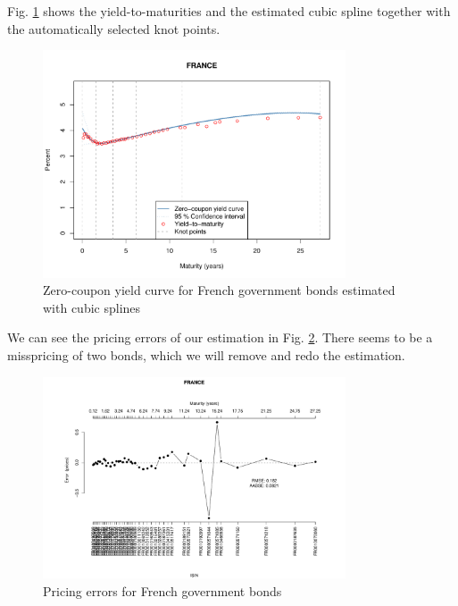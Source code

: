 
Fig. \ref{fig:frenchspotcurve} shows the yield-to-maturities and the estimated cubic spline together with the automatically selected knot points.

\begin{figure}[htb]
\centering
\caption{Zero-coupon yield curve for French government bonds estimated with cubic splines}
\label{fig:frenchspotcurve}
\includegraphics[width=0.8\textwidth]{fig_frenchspotcurve}
\end{figure}



We can see the pricing errors of our estimation in Fig. \ref{fig:pricingerrors}. There seems to be a misspricing of two bonds, which we will remove and redo the estimation.

\begin{figure}[htb]
\centering  
\caption{Pricing errors for French government bonds} 
\label{fig:pricingerrors}
\includegraphics[width=0.8\textwidth]{fig_pricingerrors}
\end{figure}

